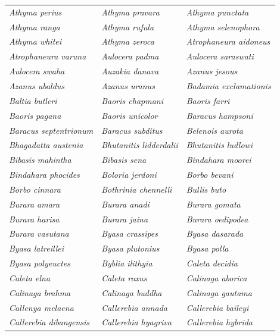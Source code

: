 \documentclass[runningheads]{llncs}
\begin{document}
\begin{longtable}{lll}
\textit{Athyma perius} & \textit{Athyma pravara} & \textit{Athyma punctata} \\
\textit{Athyma ranga} & \textit{Athyma rufula} & \textit{Athyma selenophora} \\
\textit{Athyma whitei} & \textit{Athyma zeroca} & \textit{Atrophaneura aidoneus} \\
\textit{Atrophaneura varuna} & \textit{Aulocera padma} & \textit{Aulocera saraswati} \\
\textit{Aulocera swaha} & \textit{Auzakia danava} & \textit{Azanus jesous} \\
\textit{Azanus ubaldus} & \textit{Azanus uranus} & \textit{Badamia exclamationis} \\
\textit{Baltia butleri} & \textit{Baoris chapmani} & \textit{Baoris farri} \\
\textit{Baoris pagana} & \textit{Baoris unicolor} & \textit{Baracus hampsoni} \\
\textit{Baracus septentrionum} & \textit{Baracus subditus} & \textit{Belenois aurota} \\
\textit{Bhagadatta austenia} & \textit{Bhutanitis lidderdalii} & \textit{Bhutanitis ludlowi} \\
\textit{Bibasis mahintha} & \textit{Bibasis sena} & \textit{Bindahara moorei} \\
\textit{Bindahara phocides} & \textit{Boloria jerdoni} & \textit{Borbo bevani} \\
\textit{Borbo cinnara} & \textit{Bothrinia chennelli} & \textit{Bullis buto} \\
\textit{Burara amara} & \textit{Burara anadi} & \textit{Burara gomata} \\
\textit{Burara harisa} & \textit{Burara jaina} & \textit{Burara oedipodea} \\
\textit{Burara vasutana} & \textit{Byasa crassipes} & \textit{Byasa dasarada} \\
\textit{Byasa latreillei} & \textit{Byasa plutonius} & \textit{Byasa polla} \\
\textit{Byasa polyeuctes} & \textit{Byblia ilithyia} & \textit{Caleta decidia} \\
\textit{Caleta elna} & \textit{Caleta roxus} & \textit{Calinaga aborica} \\
\textit{Calinaga brahma} & \textit{Calinaga buddha} & \textit{Calinaga gautama} \\
\textit{Callenya melaena} & \textit{Callerebia annada} & \textit{Callerebia baileyi} \\
\textit{Callerebia dibangensis} & \textit{Callerebia hyagriva} & \textit{Callerebia hybrida} \\

\end{longtable}
\end{document}

